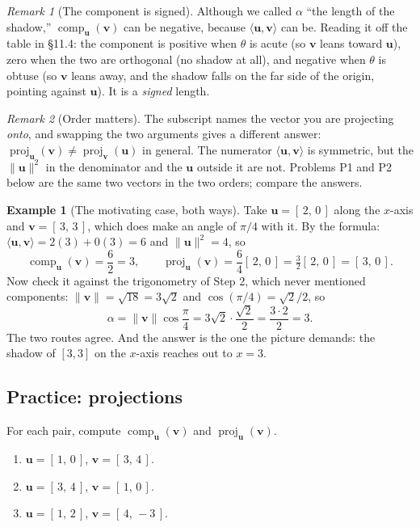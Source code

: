 \documentclass[11pt]{article}
\theoremstyle{definition}
\newtheorem{ex}{Example}
\theoremstyle{remark}
\newtheorem*{rmk}{Remark}
\newcommand{\vc}[1]{\mathbf{#1}}
\newcommand{\norm}[1]{\lVert #1\rVert}
\newcommand{\proj}[2]{\operatorname{proj}_{#1}(#2)}
\newcommand{\comp}[2]{\operatorname{comp}_{#1}(#2)}
\begin{document}
\begin{rmk}[The component is signed]
Although we called $\alpha$ ``the length of the shadow,'' $\comp{\vc{u}}{\vc{v}}$
can be negative, because $\langle\vc{u},\vc{v}\rangle$ can be. Reading it off
the table in \S11.4: the component is positive when $\theta$ is acute
(so $\vc{v}$ leans toward $\vc{u}$), zero when the two are orthogonal
(no shadow at all), and negative when $\theta$ is obtuse (so $\vc{v}$ leans
away, and the shadow falls on the far side of the origin, pointing against
$\vc{u}$). It is a \emph{signed} length.
\end{rmk}

\begin{rmk}[Order matters]
The subscript names the vector you are projecting \emph{onto}, and swapping the
two arguments gives a different answer:
$\proj{\vc{u}}{\vc{v}}\neq\proj{\vc{v}}{\vc{u}}$ in general. The numerator
$\langle\vc{u},\vc{v}\rangle$ is symmetric, but the $\norm{\vc{u}}^{2}$ in the
denominator and the $\vc{u}$ outside it are not. Problems P1 and P2 below are
the same two vectors in the two orders; compare the answers.
\end{rmk}

\begin{ex}[The motivating case, both ways]
Take $\vc{u}=[\,2,\,0\,]$ along the $x$-axis and $\vc{v}=[\,3,\,3\,]$, which
does make an angle of $\pi/4$ with it. By the formula:
$\langle\vc{u},\vc{v}\rangle=2(3)+0(3)=6$ and $\norm{\vc{u}}^{2}=4$, so
\[
  \comp{\vc{u}}{\vc{v}}=\frac{6}{2}=3,
  \qquad
  \proj{\vc{u}}{\vc{v}}=\frac{6}{4}[\,2,\,0\,]=\tfrac32[\,2,\,0\,]=[\,3,\,0\,].
\]
Now check it against the trigonometry of Step 2, which never mentioned
components: $\norm{\vc{v}}=\sqrt{18}=3\sqrt2$ and $\cos(\pi/4)=\sqrt2/2$, so
\[
  \alpha=\norm{\vc{v}}\cos\frac{\pi}{4}=3\sqrt2\cdot\frac{\sqrt2}{2}=\frac{3\cdot 2}{2}=3 .
\]
The two routes agree. And the answer is the one the picture demands: the shadow
of $[3,3]$ on the $x$-axis reaches out to $x=3$.
\end{ex}

\subsection{Practice: projections}
For each pair, compute $\comp{\vc{u}}{\vc{v}}$ and $\proj{\vc{u}}{\vc{v}}$.

\begin{enumerate}[label=\textbf{P\arabic*.},leftmargin=2.8em,itemsep=6pt,
                  topsep=6pt]
  \item $\vc{u}=[\,1,\,0\,]$, \quad $\vc{v}=[\,3,\,4\,]$.
  \item $\vc{u}=[\,3,\,4\,]$, \quad $\vc{v}=[\,1,\,0\,]$.
  \item $\vc{u}=[\,1,\,2\,]$, \quad $\vc{v}=[\,4,\,-3\,]$.
\end{enumerate}
\end{document}

